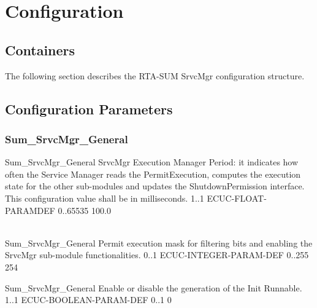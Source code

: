 {                 }

\section{Configuration}

\subsection{Containers}
\label{sec:Containers}
The following section describes the RTA-SUM SrvcMgr configuration structure.  


\subsection{Configuration Parameters}

\subsubsection{Sum_SrvcMgr_General}
\label{subsec:ConfigurationParameters}
{Sum_SrvcMgr_General}
{SrvcMgr Execution Manager Period: it indicates how often the Service Manager reads the PermitExecution, computes the execution state for the other sub-modules and updates the ShutdownPermission interface. This configuration value shall be in milliseconds.}
{1..1}
{ECUC-FLOAT-PARAMDEF}
{0..65535}
{100.0}

\\
{Sum_SrvcMgr_General}
{Permit execution mask for filtering bits and enabling the SrvcMgr sub-module functionalities.}
{0..1}
{ECUC-INTEGER-PARAM-DEF}
{0..255}
{254}
{} 


{Sum_SrvcMgr_General}
{Enable or disable the generation of the Init Runnable.}
{1..1}
{ECUC-BOOLEAN-PARAM-DEF}
{0..1}
{0}



